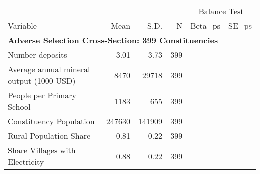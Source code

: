 \begin{tabular}{l r r r r r}\hline\hline

           &      &      &   & \multicolumn{2}{c}{\underline{Balance Test}} \\ 
  Variable & Mean & S.D. & N & Beta_{ps} & SE_{ps}  \\ \hline

\multicolumn{6}{l}{\textbf{Adverse Selection Cross-Section: 399 Constituencies}} \\
\quad Number deposits                          & 3.01          & 3.73          & 399          &  & \\
\quad Average annual mineral output (1000 USD) & 8470          & 29718          & 399          &  & \\
\quad People per Primary School                & 1183       & 655       & 399       &  & \\
\quad Constituency Population                  & 247630              & 141909              & 399              &  & \\
\quad Rural Population Share                   & 0.81      & 0.22      & 399      &  & \\
\quad Share Villages with Electricity          & 0.88 & 0.22 & 399 &  & \\


\end{tabular}
